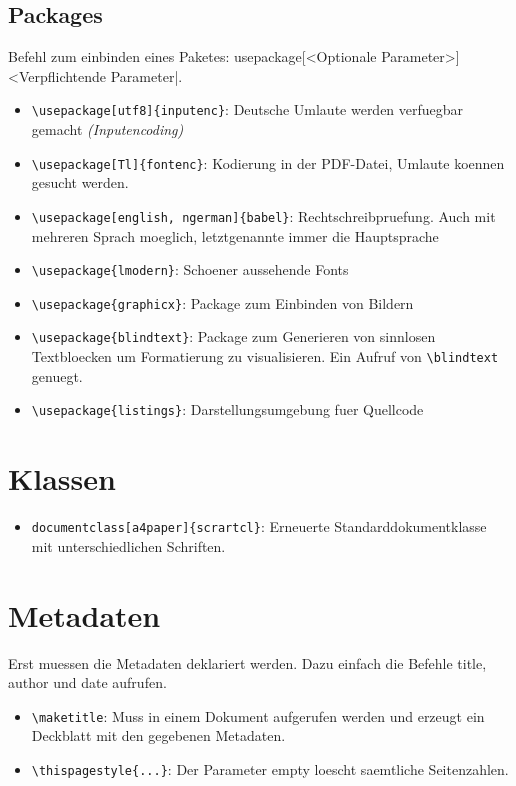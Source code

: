 \documentclass[11pt]{report}
\begin{document}
\subsection{Packages}
Befehl zum einbinden eines Paketes: 
usepackage[<Optionale Parameter>]{<Verpflichtende Parameter}|.
\begin{itemize}
  \item \verb|\usepackage[utf8]{inputenc}|: Deutsche Umlaute werden verfuegbar gemacht \emph{(Inputencoding)}
  \item \verb|\usepackage[Tl]{fontenc}|: Kodierung in der PDF-Datei, Umlaute koennen gesucht werden. 
  \item \verb|\usepackage[english, ngerman]{babel}|: Rechtschreibpruefung. Auch mit mehreren Sprach moeglich, letztgenannte immer die Hauptsprache
  \item \verb|\usepackage{lmodern}|: Schoener aussehende Fonts
  \item \verb|\usepackage{graphicx}|: Package zum Einbinden von Bildern
  \item \verb|\usepackage{blindtext}|: Package zum Generieren von sinnlosen Textbloecken um Formatierung zu visualisieren. Ein Aufruf von \verb|\blindtext| genuegt.
  \item \verb|\usepackage{listings}|: Darstellungsumgebung fuer Quellcode
\end{itemize}

\section{Klassen}
\begin{itemize}
  \item \verb|documentclass[a4paper]{scrartcl}|: Erneuerte Standarddokumentklasse mit unterschiedlichen Schriften.
\end{itemize}

\section{Metadaten}
Erst muessen die Metadaten deklariert werden. Dazu einfach die Befehle title, author und date aufrufen. 
\begin{itemize}
  \item \verb|\maketitle|: Muss in einem Dokument aufgerufen werden und erzeugt ein Deckblatt mit den gegebenen Metadaten.
  \item \verb|\thispagestyle{...}|: Der Parameter empty loescht saemtliche Seitenzahlen. 
\end{itemize}
\end{document}
